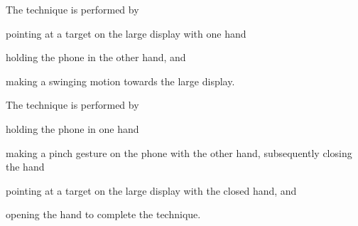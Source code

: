 The \throw technique is performed by 
\begin{enumerate*}[label=\itshape\arabic*\upshape)]
	\item{pointing at a target on the large display with one hand} 
	\item{holding the phone in the other hand, and}
	\item{making a swinging motion towards the large display.}
\end{enumerate*}

The \pinch technique is performed by 
\begin{enumerate*}[label=\itshape\arabic*\upshape)]
	\item{holding the phone in one hand} 
	\item{making a pinch gesture on the phone with the other hand, subsequently closing the hand}
	\item{pointing at a target on the large display with the closed hand, and}
	\item{opening the hand to complete the technique.}
\end{enumerate*}